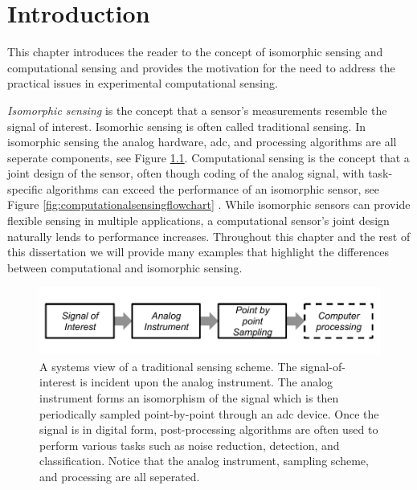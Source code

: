\chapter{Introduction}

This chapter introduces the reader to the concept of isomorphic sensing and computational sensing and provides the motivation for the need to address the practical issues in experimental computational sensing. 

\emph{Isomorphic sensing} is the concept that a sensor's measurements resemble the signal of interest. Isomorhic sensing is often called traditional sensing. In isomorphic sensing the analog hardware, \acrfull{adc}, and processing algorithms are all seperate components, see Figure \ref{fig:isomorphicsesingflowchart}. Computational sensing is the concept that a joint design of the sensor, often though coding of the analog signal, with task-specific algorithms can exceed the performance of an isomorphic sensor, see Figure \ref{fig:computationalsensingflowchart} \cite{neifeld2006taskSpecificSensing}. While isomorphic sensors can provide flexible sensing in multiple applications, a computational sensor's joint design naturally lends to performance increases. Throughout this chapter and the rest of this dissertation we will provide many examples that highlight the differences between computational and isomorphic sensing. 

\begin{figure}
    \centering
    \includegraphics[scale=1]{isomorphicsensorflowchart}
    \caption{A systems view of a traditional sensing scheme. The signal-of-interest is incident upon the analog instrument. The analog instrument forms an isomorphism of the signal which is then periodically sampled point-by-point through an \gls{adc} device. Once the signal is in digital form, post-processing algorithms are often used to perform various tasks such as noise reduction, detection, and classification. Notice that the analog instrument, sampling scheme, and processing are all seperated. }
    \label{fig:isomorphicsesingflowchart}
\end{figure}


